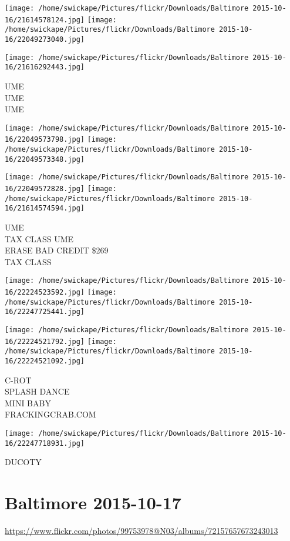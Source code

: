 \documentclass[10pt,letterpaper]{article}
\begin{document}
\texttt{[image: /home/swickape/Pictures/flickr/Downloads/Baltimore 2015-10-16/21614578124.jpg]}
\texttt{[image: /home/swickape/Pictures/flickr/Downloads/Baltimore 2015-10-16/22049273040.jpg]}

\vspace{0.25in}
\texttt{[image: /home/swickape/Pictures/flickr/Downloads/Baltimore 2015-10-16/21616292443.jpg]}

UME\\
UME\\
UME
\pagebreak

\texttt{[image: /home/swickape/Pictures/flickr/Downloads/Baltimore 2015-10-16/22049573798.jpg]}
\texttt{[image: /home/swickape/Pictures/flickr/Downloads/Baltimore 2015-10-16/22049573348.jpg]}

\texttt{[image: /home/swickape/Pictures/flickr/Downloads/Baltimore 2015-10-16/22049572828.jpg]}
\texttt{[image: /home/swickape/Pictures/flickr/Downloads/Baltimore 2015-10-16/21614574594.jpg]}

UME\\
TAX CLASS UME\\
ERASE BAD CREDIT \$269\\
TAX CLASS
\pagebreak

\texttt{[image: /home/swickape/Pictures/flickr/Downloads/Baltimore 2015-10-16/22224523592.jpg]}
\texttt{[image: /home/swickape/Pictures/flickr/Downloads/Baltimore 2015-10-16/22247725441.jpg]}

\texttt{[image: /home/swickape/Pictures/flickr/Downloads/Baltimore 2015-10-16/22224521792.jpg]}
\texttt{[image: /home/swickape/Pictures/flickr/Downloads/Baltimore 2015-10-16/22224521092.jpg]}

C{-}ROT\\
SPLASH DANCE\\
MINI BABY\\
FRACKINGCRAB.COM
\pagebreak

\texttt{[image: /home/swickape/Pictures/flickr/Downloads/Baltimore 2015-10-16/22247718931.jpg]}

DUCOTY
\pagebreak

\section*{Baltimore 2015-10-17}

\url{https://www.flickr.com/photos/99753978@N03/albums/72157657673243013}
\end{document}
